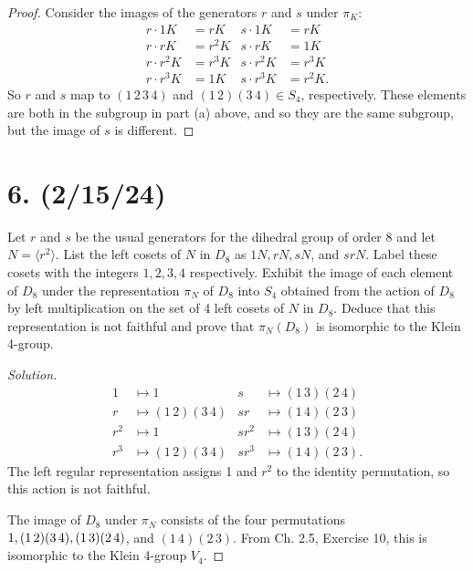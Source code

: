\documentclass{article}
\begin{document}
\begin{enumerate}[label=(\alph*), itemsep=0em]
        \begin{proof}
            Consider the images of the generators $r$ and $s$ under $\pi_K$:
            \begin{align*}
                r \cdot 1K &= rK & s \cdot 1K &= rK \\
                r \cdot rK &= r^2K & s \cdot rK &= 1K \\
                r \cdot r^2K &= r^3K & s \cdot r^2K &= r^3K \\
                r \cdot r^3K &= 1K & s \cdot r^3K &= r^2K.
            \end{align*}
            So $r$ and $s$ map to $(1\,2\,3\,4)$ and $(1\,2)(3\,4) \in S_4$, respectively. These elements are both in the subgroup in part (a) above, and so they are the same subgroup, but the image of $s$ is different.
        \end{proof}
\end{enumerate}

\section*{6. (2/15/24)}

Let $r$ and $s$ be the usual generators for the dihedral group of order 8 and let $N = \langle r^2 \rangle$. List the left cosets of $N$ in $D_8$ as $1N, rN, sN$, and $srN$. Label these cosets with the integers $1, 2, 3, 4$ respectively. Exhibit the image of each element of $D_8$ under the representation $\pi_N$ of $D_8$ into $S_4$ obtained from the action of $D_8$ by left multiplication on the set of 4 left cosets of $N$ in $D_8$. Deduce that this representation is not faithful and prove that $\pi_N(D_8)$ is isomorphic to the Klein 4-group.

\begin{proof}[Solution]
    \begin{align*}
        1 &\mapsto 1 & s &\mapsto (1\,3)(2\,4) \\
        r &\mapsto (1\,2)(3\,4) & sr &\mapsto (1\,4)(2\,3) \\
        r^2 &\mapsto 1 & sr^2 &\mapsto (1\,3)(2\,4) \\
        r^3 &\mapsto (1\,2)(3\,4) & sr^3 &\mapsto (1\,4)(2\,3).
    \end{align*}
    The left regular representation assigns 1 and $r^2$ to the identity permutation, so this action is not faithful.

    The image of $D_8$ under $\pi_N$ consists of the four permutations $1, (1\,2)(3\,4), \newline (1\,3)(2\,4)$, and $(1\,4)(2\,3)$. From Ch. 2.5, Exercise 10, this is isomorphic to the Klein 4-group $V_4$.
\end{proof}
\end{document}

